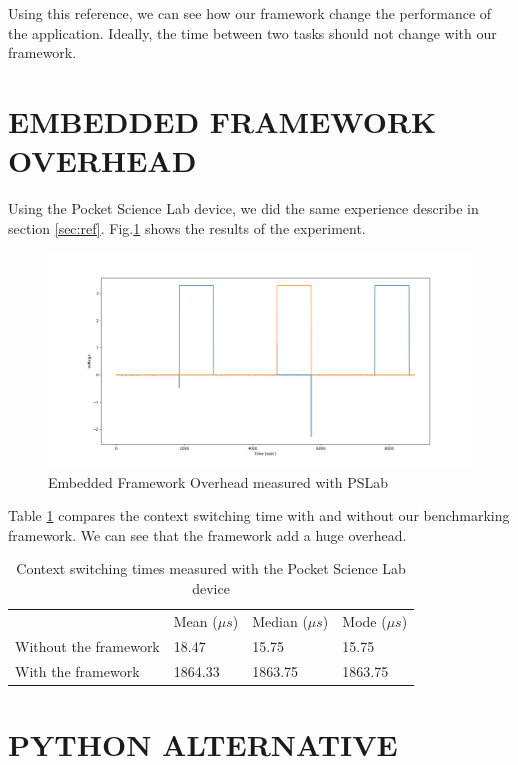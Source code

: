 \documentclass[a4paper, 10pt, conference]{ieeeconf}      %
\begin{document}
Using this reference, we can see how our framework change the performance of the application. Ideally, the time between two tasks should not change with our framework.

\section{EMBEDDED FRAMEWORK OVERHEAD}

Using the Pocket Science Lab device, we did the same experience describe in section \ref{sec:ref}. Fig.\ref{fig:framework_overhead} shows the results of the experiment.

\begin{figure}[!h]
    \centering
    \includegraphics[scale=0.2]{framework_overhead.png}
    \caption{Embedded Framework Overhead measured with PSLab}
    \label{fig:framework_overhead}
\end{figure}

Table \ref{table:context_switching_times} compares the context switching time with and without our benchmarking framework. We can see that the framework add a huge overhead.


\begin{table}[!h]
    \centering
    \caption{Context switching times measured with the Pocket Science Lab device}
    \begin{tabular}{llll}
        \cline{2-4}
        & Mean ($\mu s$) & Median ($\mu s$) & Mode ($\mu s$) \\ \cline{2-4}
        Without the framework & 18.47 & 15.75 & 15.75 \\
        With the framework & 1864.33 & 1863.75 & 1863.75
    \end{tabular}
    \label{table:context_switching_times}
\end{table}

\section{PYTHON ALTERNATIVE}
\end{document}

